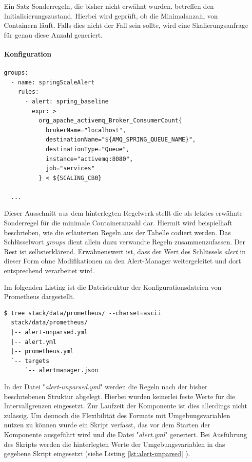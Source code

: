 Ein Satz Sonderregeln, die bisher nicht erwähnt wurden, betreffen den Initialisierungszustand. Hierbei wird geprüft, ob die Minimalanzahl von Containern läuft. Falls dies nicht der Fall sein sollte, wird eine Skalierungsanfrage für genau diese Anzahl generiert.


\paragraph{Konfiguration}

\begin{lstlisting}[style=bashStyle,caption={Umgebungsvariablen - Prometheus Regelsatz},label=lst:envMatrix]
  groups:
  - name: springScaleAlert
    rules:
      - alert: spring_baseline
        expr: >
          org_apache_activemq_Broker_ConsumerCount{
            brokerName="localhost",
            destinationName="${AMQ_SPRING_QUEUE_NAME}", 
            destinationType="Queue",
            instance="activemq:8080", 
            job="services"
          } < ${SCALING_CB0} 

  ...

\end{lstlisting}

Dieser Ausschnitt aus dem hinterlegten Regelwerk stellt die als letztes erwähnte Sonderregel für die minimale Containeranzahl dar. Hiermit wird beispielhaft beschrieben, wie die erläuterten Regeln aus der Tabelle codiert werden. Das Schlüsselwort \emph{groups} dient allein dazu verwandte Regeln zusammenzufassen. Der Rest ist selbsterklärend. Erwähnenswert ist, dass der Wert des Schlüssels \emph{alert} in dieser Form ohne Modifikationen an den Alert-Manager weitergeleitet und dort entsprechend verarbeitet wird.

Im folgenden Listing ist die Dateistruktur der Konfigurationsdateien von Prometheus dargestellt.

\begin{lstlisting}[style=bashStyle,caption={Prometheus -- Konfigurationsstruktur},label=lst:envMatrix]
  $ tree stack/data/prometheus/ --charset=ascii
  stack/data/prometheus/
  |-- alert-unparsed.yml
  |-- alert.yml
  |-- prometheus.yml
  `-- targets
      `-- alertmanager.json
\end{lstlisting}

In der Datei "\emph{alert-unparsed.yml}" werden die Regeln nach der bisher beschriebenen Struktur abgelegt. Hierbei wurden keinerlei feste Werte für die Intervallgrenzen eingesetzt. Zur Laufzeit der Komponente ist dies allerdings nicht zulässig. Um dennoch die Flexibilität des Formats mit Umgebungsvariablen nutzen zu können wurde ein Skript verfasst, das vor dem Starten der Komponente ausgeführt wird und die Datei "\emph{alert.yml}" generiert. Bei Ausführung des Skripts werden die hinterlegten Werte der Umgebungsvariablen in das gegebene Skript eingesetzt (siehe Listing \ref{lst:alert-unparsed} ). 

